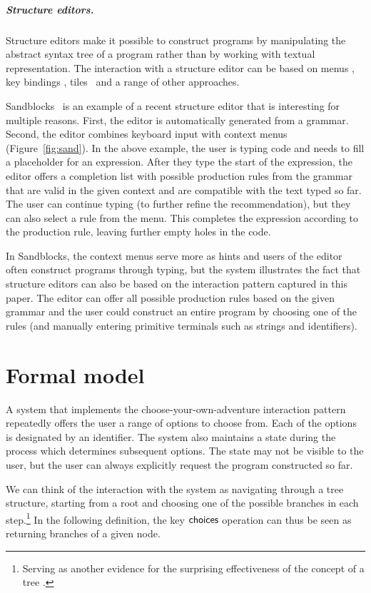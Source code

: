 \documentclass[a4paper,UKenglish,cleveref, autoref, thm-restate]{lipics-v2021}
\newcommand{\ident}[1]{\textsf{#1}}
\newcommand{\choices}{\textnormal{\ident{choices}}}
\begin{document}
\subparagraph{Structure editors.}
Structure editors make it possible to construct programs by manipulating the abstract syntax tree
of a program rather than by working with textual representation. The interaction with a structure
editor can be based on menus \cite{teitelbaum-1981-synth}, key bindings \cite{weber-2017-editors},
tiles~\cite{moon-2022-tylr} and a range of other approaches.

Sandblocks~\cite{beckmann-2023-all} is an example of a recent structure editor that is interesting
for multiple reasons. First, the editor is automatically generated from a grammar. Second, the
editor combines keyboard input with context menus (Figure~\ref{fig:sand}). In the above example,
the user is typing code and needs to fill a placeholder for an expression. After they type the
start of the expression, the editor offers a completion list with possible production rules from
the grammar that are valid in the given context and are compatible with the text typed so far. The
user can continue typing (to further refine the recommendation), but they can also select a rule
from the menu. This completes the expression according to the production rule, leaving further
empty holes in the code.

In Sandblocks, the context menus serve more as hints and users of the editor often
construct programs through typing, but the system illustrates the fact that structure editors
can also be based on the interaction pattern captured in this paper. The editor can offer
all possible production rules based on the given grammar and the user could construct an
entire program by choosing one of the rules (and manually entering primitive terminals such as
strings and identifiers).

\newpage

\section{Formal model}
\label{sec:calculus}

A system that implements the choose-your-own-adventure interaction pattern repeatedly offers
the user a range of options to choose from. Each of the options is designated by an identifier.
The system also maintains a state during the process which determines subsequent options. The state
may not be visible to the user, but the user can always explicitly request the program constructed
so far.

We can think of the interaction with the system as navigating through a tree structure, starting
from a root and choosing one of the possible branches in each step.\footnote{Serving as another
evidence for the surprising effectiveness of the concept of a tree \cite{nesetril-2005-strom}.}
In the following definition, the key $\choices$ operation can thus be seen as returning
branches of a given node.
\end{document}
